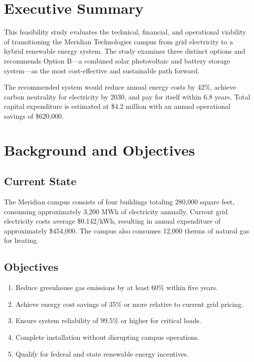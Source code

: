 \documentclass[
    language=english,
    doctype=feasibility-study,
    institution=none,
]{../../omnilatex}
\begin{document}
\maketitle

\section{Executive Summary}

This feasibility study evaluates the technical, financial, and operational
viability of transitioning the Meridian Technologies campus from grid
electricity to a hybrid renewable energy system. The study examines three
distinct options and recommends Option B---a combined solar photovoltaic and
battery storage system---as the most cost-effective and sustainable path
forward.

The recommended system would reduce annual energy costs by 42\%, achieve
carbon neutrality for electricity by 2030, and pay for itself within 6.8
years. Total capital expenditure is estimated at \$4.2 million with an
annual operational savings of \$620,000.

\section{Background and Objectives}

\subsection{Current State}

The Meridian campus consists of four buildings totaling 280,000 square feet,
consuming approximately 3,200 MWh of electricity annually. Current grid
electricity costs average \$0.142/kWh, resulting in annual expenditure of
approximately \$454,000. The campus also consumes 12,000 therms of natural
gas for heating.

\subsection{Objectives}

\begin{enumerate}
    \item Reduce greenhouse gas emissions by at least 60\% within five years.
    \item Achieve energy cost savings of 35\% or more relative to current
          grid pricing.
    \item Ensure system reliability of 99.5\% or higher for critical loads.
    \item Complete installation without disrupting campus operations.
    \item Qualify for federal and state renewable energy incentives.
\end{enumerate}
\end{document}
